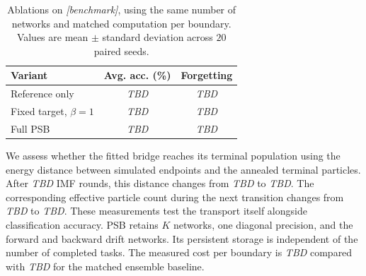 \begin{table}[t]
\centering
\caption{Ablations on \emph{[benchmark]}, using the same number of
networks and matched computation per boundary. Values are mean
$\pm$ standard deviation across $20$ paired seeds.}
\label{tab:ablations}
\setlength{\tabcolsep}{4pt}
\begin{tabular}{lcc}
\hline
Variant & Avg. acc. (\%) & Forgetting \\
\hline
Reference only & \textit{TBD} & \textit{TBD} \\
Fixed target, $\beta=1$ & \textit{TBD} & \textit{TBD} \\
Full PSB & \textit{TBD} & \textit{TBD} \\
\hline
\end{tabular}
\end{table}

We assess whether the fitted bridge reaches its terminal population
using the energy distance between simulated endpoints and the
annealed terminal particles. After \textit{TBD} IMF rounds, this
distance changes from \textit{TBD} to \textit{TBD}. The corresponding
effective particle count during the next transition changes from
\textit{TBD} to \textit{TBD}. These measurements test the transport
itself alongside classification accuracy. PSB retains $K$ networks,
one diagonal precision, and the forward and backward drift networks.
Its persistent storage is independent of the number of completed
tasks. The measured cost per boundary is \textit{TBD} compared with
\textit{TBD} for the matched ensemble baseline.
